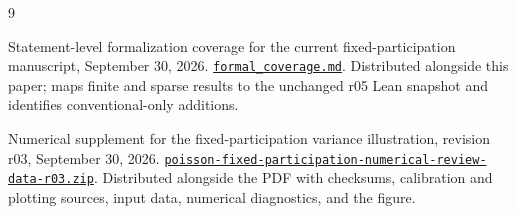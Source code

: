\documentclass[11pt]{article}
\theoremstyle{remark}
\begin{document}
\begin{thebibliography}{9}
{\raggedright
Statement-level formalization coverage for the current fixed-participation
manuscript, September 30, 2026.
\newblock \href{formal_coverage.md}{\nolinkurl{formal_coverage.md}}.
\newblock Distributed alongside this paper; maps finite and sparse results
to the unchanged r05 Lean snapshot and identifies conventional-only additions.\par}

{\raggedright
Numerical supplement for the fixed-participation variance illustration,
revision r03, September 30, 2026.
\newblock
\href{poisson-fixed-participation-numerical-review-data-r03.zip}{%
\nolinkurl{poisson-fixed-participation-numerical-review-data-r03.zip}}.
\newblock Distributed alongside the PDF with checksums, calibration and
plotting sources, input data, numerical diagnostics, and the figure.\par}

\end{thebibliography}
\end{document}
